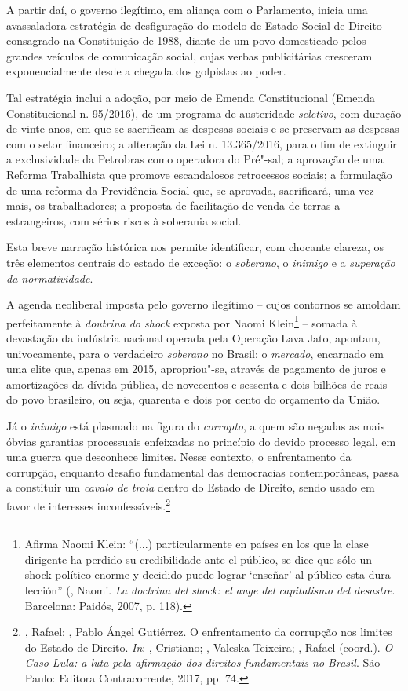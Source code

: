 A partir daí, o governo ilegítimo, em aliança com o Parlamento, inicia
uma avassaladora estratégia de desfiguração do modelo de Estado Social
de Direito consagrado na Constituição de 1988, diante de um povo
domesticado pelos grandes veículos de comunicação social, cujas verbas
publicitárias cresceram exponencialmente desde a chegada dos golpistas
ao poder.

Tal estratégia inclui a adoção, por meio de Emenda Constitucional
(Emenda Constitucional n. 95/2016), de um programa de austeridade
\emph{seletivo}, com duração de vinte anos, em que se sacrificam as
despesas sociais e se preservam as despesas com o setor financeiro; a
alteração da Lei n. 13.365/2016, para o fim de extinguir a exclusividade
da Petrobras como operadora do Pré"-sal; a aprovação de uma Reforma
Trabalhista que promove escandalosos retrocessos sociais; a formulação
de uma reforma da Previdência Social que, se aprovada, sacrificará, uma
vez mais, os trabalhadores; a proposta de facilitação de venda de terras
a estrangeiros, com sérios riscos à soberania social.

Esta breve narração histórica nos permite identificar, com chocante
clareza, os três elementos centrais do estado de exceção: o
\emph{soberano}, o \emph{inimigo} e a \emph{superação da normatividade}.

A agenda neoliberal imposta pelo governo ilegítimo -- cujos contornos se
amoldam perfeitamente à \emph{doutrina do shock} exposta por Naomi
Klein\footnote{Afirma Naomi Klein: ``(...) particularmente en países en
  los que la clase dirigente ha perdido su credibilidade ante el
  público, se dice que sólo un shock político enorme y decidido puede
  lograr `enseñar' al público esta dura lección'' (, Naomi.
  \emph{La doctrina del shock: el auge del capitalismo del desastre}.
  Barcelona: Paidós, 2007, p. 118).} -- somada à devastação da indústria
nacional operada pela Operação Lava Jato, apontam, univocamente, para o
verdadeiro \emph{soberano} no Brasil: o \emph{mercado}, encarnado em uma
elite que, apenas em 2015, apropriou"-se, através de pagamento de juros e
amortizações da dívida pública, de novecentos e sessenta e dois bilhões
de reais do povo brasileiro, ou seja, quarenta e dois por cento do
orçamento da União.

Já o \emph{inimigo} está plasmado na figura do \emph{corrupto}, a quem
são negadas as mais óbvias garantias processuais enfeixadas no princípio
do devido processo legal, em uma guerra que desconhece limites. Nesse
contexto, o enfrentamento da corrupção, enquanto desafio fundamental das
democracias contemporâneas, passa a constituir um \emph{cavalo de troia}
dentro do Estado de Direito, sendo usado em favor de interesses
inconfessáveis.\footnote{, Rafael; , Pablo Ángel
  Gutiérrez. O enfrentamento da corrupção nos limites do Estado de
  Direito. \emph{In}:  , Cristiano;  , Valeska
  Teixeira; , Rafael (coord.). \emph{O Caso Lula: a luta pela
  afirmação dos direitos fundamentais no Brasil}. São Paulo: Editora
  Contracorrente, 2017, pp. 74.}

